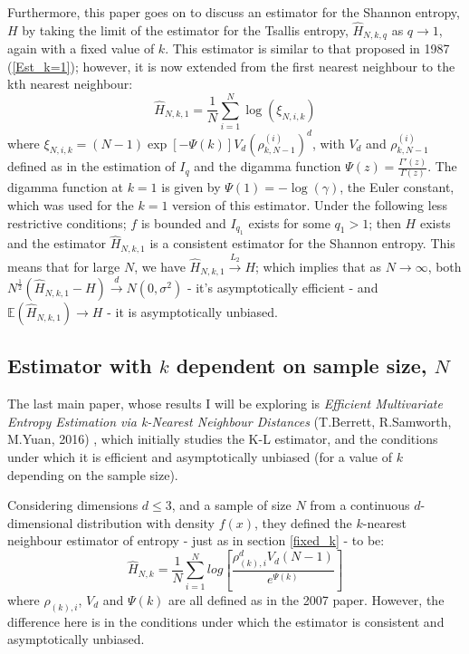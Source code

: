 \documentclass[12pt]{report}
\begin{document}
Furthermore, this paper goes on to discuss an estimator for the Shannon entropy, $H$ by taking the limit of the estimator for the Tsallis entropy, $\hat{H}_{N, k, q}$ as $q \to 1$, again with a fixed value of $k$. This estimator is similar to that proposed in 1987 (\ref{Est_k=1}); however, it is now extended from the first nearest neighbour to the kth nearest neighbour:
\begin{equation}
\hat{H}_{N, k, 1} =  \frac{1}{N} \sum_{i=1}^{N} \log (\xi_{N, i, k})
\end{equation} 
where $\xi_{N, i, k} = (N-1)\exp[-\Psi(k)]V_{d}(\rho_{k, N-1}^{(i)})^{d}$, with $V_{d}$ and $\rho_{k, N-1}^{(i)}$ defined as in the estimation of $I_{q}$ and the digamma function $\Psi(z) = \frac{\Gamma'(z)}{\Gamma(z)}$. The digamma function at $k=1$ is given by $\Psi(1) = -\log(\gamma)$, the Euler constant, which was used for the $k=1$ version of this estimator. Under the following less restrictive conditions; $f$ is bounded and $I_{q_{1}}$ exists for some $q_{1} > 1$; then $H$ exists and the estimator $\hat{H}_{N, k, 1}$ is a consistent estimator for the Shannon entropy. This means that for large $N$, we have $\hat{H}_{N, k, 1} \overset{L_{2}}{\to} H$; which implies that as $N \to \infty$, both $N^{\frac{1}{2}}(\hat{H}_{N, k, 1} - H) \overset{d}{\to} N(0, \sigma^2)$ - it's asymptotically efficient - and $\mathbb{E}(\hat{H}_{N, k, 1}) \to H$ - it is asymptotically unbiased.



\subsection{Estimator with $k$ dependent on sample size, $N$} \label{dependent_k}

The last main paper, whose results I will be exploring is \textit{Efficient Multivariate Entropy Estimation via k-Nearest Neighbour Distances} (T.Berrett, R.Samworth, M.Yuan, 2016) \cite{paper4}, which initially studies the K-L estimator, and the conditions under which it is efficient and asymptotically unbiased (for a value of $k$ depending on the sample size). 

Considering dimensions $d \leq 3$, and a sample of size $N$ from a continuous $d$-dimensional distribution with density $f(x)$, they defined the $k$-nearest neighbour estimator of entropy - just as in section \ref{fixed_k} - to be:
\begin{equation}
\hat{H}_{N, k} = \frac{1}{N} \sum_{i=1}^{N} log \left[ \frac{\rho_{(k),i}^{d} V_{d} (N-1)}{e^{\Psi(k)}} \right]
\end{equation}
where $\rho_{(k),i}$, $V_{d}$ and $\Psi(k)$ are all defined as in the 2007 paper. However, the difference here is in the conditions under which the estimator is consistent and asymptotically unbiased.
\end{document}
